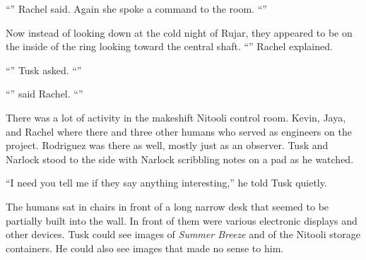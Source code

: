 
``'' Rachel said. Again she spoke a command to the room.
``''

Now instead of looking down at the cold night of Rujar, they appeared to be on the inside of the
ring looking toward the central shaft. ``'' Rachel
explained.


``'' Tusk asked. ``''

``'' said Rachel. ``''

%
%

\breakpoint



There was a lot of activity in the makeshift Nitooli control room. Kevin, Jaya, and Rachel where
there and three other humans who served as engineers on the project. Rodriguez was there as
well, mostly just as an observer. Tusk and Narlock stood to the side with Narlock scribbling
notes on a pad as he watched.

``I need you tell me if they say anything interesting,'' he told Tusk quietly.

The humans sat in chairs in front of a long narrow desk that seemed to be partially built into
the wall. In front of them were various electronic displays and other devices. Tusk could see
images of \textit{Summer Breeze} and of the Nitooli storage containers. He could also see images
that made no sense to him.


